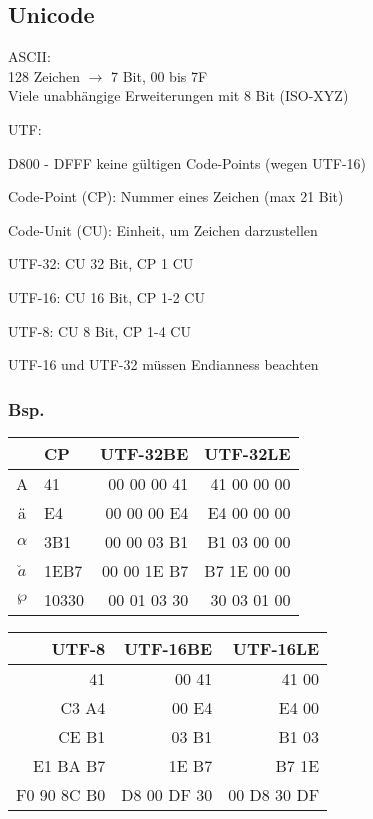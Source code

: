 \begin{multicols*}{5}
\vspace{-7pt}

\section{Unicode}

\textcolor{h}{ASCII:}\\
128 Zeichen $\rightarrow$ 7 Bit, 00 bis 7F\\
Viele unabhängige Erweiterungen mit 8 Bit (ISO-XYZ)

\textcolor{h}{UTF:}
\begin{compactitem}[$\bullet$]
	\item D800 - DFFF keine gültigen Code-Points (wegen UTF-16)
	\item Code-Point (CP): Nummer eines Zeichen (max 21 Bit)
	\item Code-Unit (CU): Einheit, um Zeichen darzustellen
	\item UTF-32: CU 32 Bit, CP 1 CU
	\item UTF-16: CU 16 Bit, CP 1-2 CU
	\item UTF-8: CU 8 Bit, CP 1-4 CU
	\item UTF-16 und UTF-32 müssen Endianness beachten
\end{compactitem}



\subsubsection{Bsp.}
\vspace{-2pt}
\begin{tabular}{c p{.82cm} | r | r}
	\hline
	&CP&UTF-32BE&UTF-32LE\\
	\hline
	A&41&00 00 00 41&41 00 00 00\\
	ä&E4&00 00 00 E4&E4 00 00 00\\
	$\alpha$&3B1& 00 00 03 B1& B1 03 00 00\\
	$\breve{a}$&1EB7&00 00 1E B7& B7 1E 00 00\\
	$\wp$&10330& 00 01 03 30& 30 03 01 00 \\
	\hline
	
\end{tabular}


\begin{tabular}{ r | r | r}
	\hline
	UTF-8&UTF-16BE&UTF-16LE\\
	\hline
	41&00 41&41 00 \\
	C3 A4&00 E4&E4 00\\
	CE B1&03 B1&B1 03\\
	E1 BA B7&1E B7&B7 1E\\
	F0 90 8C B0& D8 00 DF 30&00 D8 30 DF\\
\hline
	

\end{tabular}
\end{multicols*}
